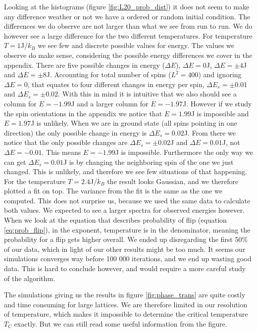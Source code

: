 \documentclass[reprint, english,notitlepage,nofootinbib]{revtex4-1}  %
\begin{document}
Looking at the histograms (figure \ref{fig:L20_prob_dist}) it does not seem to make any difference weather or not we have a ordered or random initial condition. The differences we do observe are not larger than what we see from run to run. We do however see a large difference for the two different temperatures. For temperature $T = 1$J/$k_B$ we see few and discrete possible values for energy. The values we observe do make sense, considering the possible energy differences we cover in the appendix. There are five possible changes in energy ($\Delta E$), $\Delta E = 0$J, $\Delta E = \pm 4$J and $\Delta E = \pm8$J. Accounting for total number of spins ($L^2 = 400$) and ignoring $\Delta E = 0$, that equates to four different changes in energy per spin, $\Delta E_s = \pm0.01$ and $\Delta E_s = \pm0.02$. With this in mind it is intuitive that we also should see a column for $E = -1.99$J and a larger column for $E = -1.97$J. However if we study the spin orientations in the appendix we notice that $E=1.99$J is impossible and $E = 1.97$J is unlikely. When we are in ground state (all spins pointing in one direction) the only possible change in energy is $\Delta E_s=0.02$J. From there we notice that the only possible changes are $\Delta E_s = \pm 0.02$J and $\Delta E = 0.01$J, not $\Delta E = -0.01$. This means $E = -1.99$J is impossible. Furthermore the only way we can get $\Delta E_s=0.01$J is by changing the neighboring spin of the one we just changed. This is unlikely, and therefore we see few situations of that happening. For the temperature $T = 2.4$J/$k_B$ the result looks Gaussian, and we therefore plotted a fit on top. The variance from the fit is the same as the one we computed. This does not surprise us, because we used the same data to calculate both values. We expected to see a larger spectra for observed energies however. When we look at the equation that describes probability of flip (equation \eqref{eq:prob_flip}), in the exponent, temperature is in the denominator, meaning the probability for a flip gets higher overall. We ended up disregarding the first 50\% of our data, which in light of our other results might be too much. It seems our simulations converges way before 100 000 iterations, and we end up wasting good data. This is hard to conclude however, and would require a more careful study of the algorithm.

The simulations giving us the results in figure \ref{fig:phase_trans} are quite costly and time consuming for large lattices. We are therefore limited in our resolution of temperature, which makes it impossible to determine the critical temperature $T_C$ exactly. But we can still read some useful information from the figure.
\end{document}
